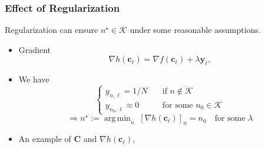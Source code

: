 \documentclass[10pt,xcolor={usenames,dvipsnames,table}]{beamer}
\DeclareMathOperator*{\argmin}{arg\,min}
\newcommand\mymatrixbraceoffseth{0.5em}
\newcommand*\mymatrixbraceright[4][m]{
    \draw[mymatrixbrace] ($(#1.north west)!(#1-#3-1.south west)!(#1.south west)-(\mymatrixbraceoffseth,0)$)
        -- node[left=2pt] {#4} 
        ($(#1.north west)!(#1-#2-1.north west)!(#1.south west)-(\mymatrixbraceoffseth,0)$);
}
\begin{document}
\begin{frame}[label=current]
    \frametitle{Effect of Regularization}
    \begin{block}

        Regularization can ensure $n^{\star} \in \mathcal{K}$ under some reasonable assumptions.
    \end{block}
    \begin{itemize}
        \item Gradient 
\begin{equation*} 
    \nabla h(\bm{c}_\ell) = \nabla f(\bm{c}_\ell) + \lambda \bm{y}_\ell, 
\end{equation*}
    \item We have 
        \[
            \begin{cases}
                y_{n, \ell} = 1/N \quad & \text{if } n \notin \mathcal{K} \\
                y_{n_0, \ell} \approx 0 \quad& \text{for some }  n_0 \in \mathcal{K}
            \end{cases}
        \] 
        \[
            \Rightarrow n^{\star}:=\argmin_{n} \; [\nabla h(\bm{c}_\ell)]_n = n_0 \quad \text{for some $\lambda$}
        \] 
\item An example of $\bm{C}$ and $\nabla h(\bm{c}_\ell)$,
%

\end{itemize}
\end{frame}
\end{document}
